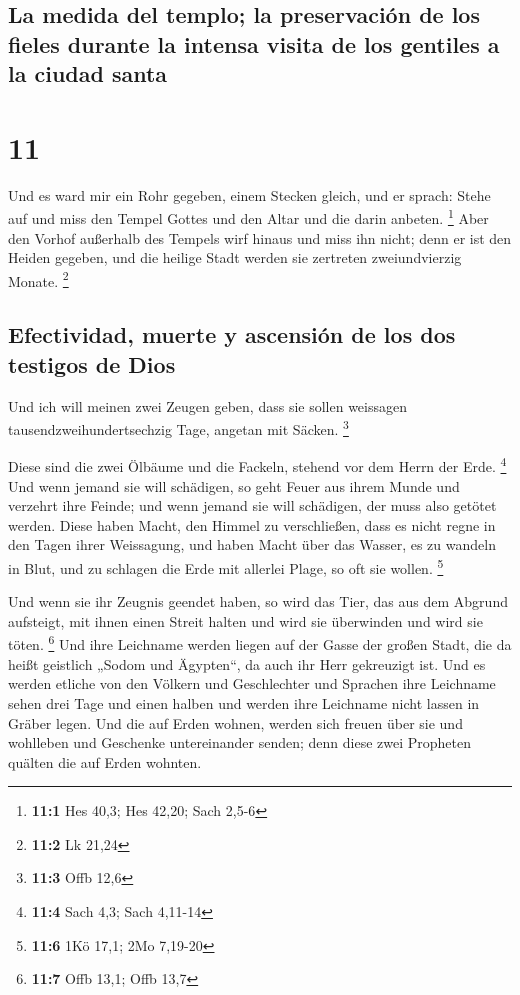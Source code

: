 \hypertarget{la-medida-del-templo-la-preservaciuxf3n-de-los-fieles-durante-la-intensa-visita-de-los-gentiles-a-la-ciudad-santa}{%
\subsection{La medida del templo; la preservación de los fieles durante
la intensa visita de los gentiles a la ciudad
santa}\label{la-medida-del-templo-la-preservaciuxf3n-de-los-fieles-durante-la-intensa-visita-de-los-gentiles-a-la-ciudad-santa}}

\hypertarget{section-10}{%
\section{11}\label{section-10}}

 Und es ward mir ein Rohr gegeben, einem Stecken gleich,
und er sprach: Stehe auf und miss den Tempel Gottes und den Altar und
die darin anbeten. \footnote{\textbf{11:1} Hes 40,3; Hes 42,20; Sach
  2,5-6}  Aber den Vorhof außerhalb des Tempels wirf
hinaus und miss ihn nicht; denn er ist den Heiden gegeben, und die
heilige Stadt werden sie zertreten zweiundvierzig Monate. \footnote{\textbf{11:2}
  Lk 21,24}

\hypertarget{efectividad-muerte-y-ascensiuxf3n-de-los-dos-testigos-de-dios}{%
\subsection{Efectividad, muerte y ascensión de los dos testigos de
Dios}\label{efectividad-muerte-y-ascensiuxf3n-de-los-dos-testigos-de-dios}}

 Und ich will meinen zwei Zeugen geben, dass sie sollen
weissagen tausendzweihundertsechzig Tage, angetan mit Säcken.
\footnote{\textbf{11:3} Offb 12,6}

 Diese sind die zwei Ölbäume und die Fackeln, stehend vor
dem Herrn der Erde. \footnote{\textbf{11:4} Sach 4,3; Sach 4,11-14}
 Und wenn jemand sie will schädigen, so geht Feuer aus
ihrem Munde und verzehrt ihre Feinde; und wenn jemand sie will
schädigen, der muss also getötet werden.  Diese haben
Macht, den Himmel zu verschließen, dass es nicht regne in den Tagen
ihrer Weissagung, und haben Macht über das Wasser, es zu wandeln in
Blut, und zu schlagen die Erde mit allerlei Plage, so oft sie wollen.
\footnote{\textbf{11:6} 1Kö 17,1; 2Mo 7,19-20}

 Und wenn sie ihr Zeugnis geendet haben, so wird das Tier,
das aus dem Abgrund aufsteigt, mit ihnen einen Streit halten und wird
sie überwinden und wird sie töten. \footnote{\textbf{11:7} Offb 13,1;
  Offb 13,7}  Und ihre Leichname werden liegen auf der
Gasse der großen Stadt, die da heißt geistlich „Sodom und Ägypten``, da
auch ihr Herr gekreuzigt ist.  Und es werden etliche von
den Völkern und Geschlechter und Sprachen ihre Leichname sehen drei Tage
und einen halben und werden ihre Leichname nicht lassen in Gräber legen.
 Und die auf Erden wohnen, werden sich freuen über sie
und wohlleben und Geschenke untereinander senden; denn diese zwei
Propheten quälten die auf Erden wohnten.

